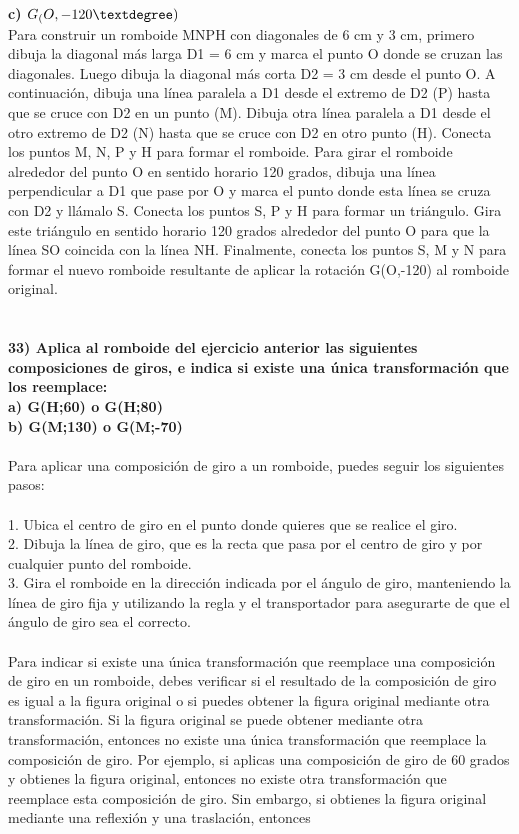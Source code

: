 \documentclass{article}
\begin{document}
{\bf c) $G_(O,-120\textdegree)$ } \\
Para construir un romboide MNPH con diagonales de 6 cm y 3 cm, primero dibuja la diagonal más larga D1 = 6 cm y marca el punto O donde se cruzan las diagonales. Luego dibuja la diagonal más corta D2 = 3 cm desde el punto O.   A continuación, dibuja una línea paralela a D1 desde el extremo de D2 (P) hasta que se cruce con D2 en un punto (M). Dibuja otra línea paralela a D1 desde el otro extremo de D2 (N) hasta que se cruce con D2 en otro punto (H).   Conecta los puntos M, N, P y H para formar el romboide.   Para girar el romboide alrededor del punto O en sentido horario 120 grados, dibuja una línea perpendicular a D1 que pase por O y marca el punto donde esta línea se cruza con D2 y llámalo S.   Conecta los puntos S, P y H para formar un triángulo. Gira este triángulo en sentido horario 120 grados alrededor del punto O para que la línea SO coincida con la línea NH.   Finalmente, conecta los puntos S, M y N para formar el nuevo romboide resultante de aplicar la rotación G(O,-120) al romboide original.\\
\\
\\
{\bf 33) Aplica al romboide del ejercicio anterior las siguientes composiciones de giros, e indica si existe una única transformación que los reemplace: }\\
{\bf a) G(H;60) o G(H;80) }  \\
{\bf b) G(M;130) o G(M;-70) } \\
\\
Para aplicar una composición de giro a un romboide, puedes seguir los siguientes pasos:\\
\\
1. Ubica el centro de giro en el punto donde quieres que se realice el giro.\\
2. Dibuja la línea de giro, que es la recta que pasa por el centro de giro y por cualquier punto del romboide.\\
3. Gira el romboide en la dirección indicada por el ángulo de giro, manteniendo la línea de giro fija y utilizando la regla y el transportador para asegurarte de que el ángulo de giro sea el correcto.\\
\\
Para indicar si existe una única transformación que reemplace una composición de giro en un romboide, debes verificar si el resultado de la composición de giro es igual a la figura original o si puedes obtener la figura original mediante otra transformación. Si la figura original se puede obtener mediante otra transformación, entonces no existe una única transformación que reemplace la composición de giro. Por ejemplo, si aplicas una composición de giro de 60 grados y obtienes la figura original, entonces no existe otra transformación que reemplace esta composición de giro. Sin embargo, si obtienes la figura original mediante una reflexión y una traslación, entonces\\
\end{document}
